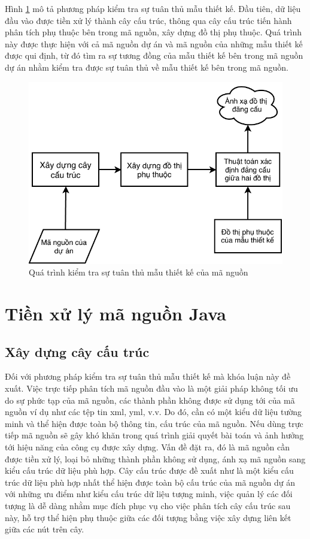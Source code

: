 \documentclass[12pt]{report}
\begin{document}
\noindent Hình \ref{fig:general_architecture} mô tả phương pháp kiểm tra sự tuân thủ mẫu thiết kế. Đầu tiên, dữ liệu đầu vào được tiền xử lý thành cây cấu trúc, thông qua cây cấu trúc tiến hành phân tích phụ thuộc bên trong mã nguồn, xây dựng đồ thị phụ thuộc. Quá trình này được thực hiện với cả mã nguồn dự án và mã nguồn của những mẫu thiết kế được qui định, từ đó tìm ra sự tương đồng của mẫu thiết kế bên trong mã nguồn dự án nhằm kiểm tra được sự tuân thủ về mẫu thiết kế bên trong mã nguồn.
\begin{figure}[h]
	\centering
	\includegraphics[scale=1.1]{images/general_architecture_3_1_2}
	\caption{Quá trình kiểm tra sự tuân thủ mẫu thiết kế của mã nguồn}
	\label{fig:general_architecture}
\end{figure}
\section{Tiền xử lý mã nguồn Java}
\subsection{Xây dựng cây cấu trúc}
Đối với phương pháp kiểm tra sự tuân thủ mẫu thiết kế mà khóa luận này đề xuất. Việc trực tiếp phân tích mã nguồn đầu vào là một giải pháp không tối ưu do sự phức tạp của mã nguồn, các thành phần không được sử dụng tới của mã nguồn ví dụ như các tệp tin xml, yml, v.v. Do đó, cần có một kiểu dữ liệu tường minh và thể hiện được toàn bộ thông tin, cấu trúc của mã nguồn. Nếu dùng trực tiếp mã nguồn sẽ gây khó khăn trong quá trình giải quyết bài toán và ảnh hưởng tới hiệu năng của công cụ được xây dựng. Vấn đề đặt ra, đó là mã nguồn cần được tiền xử lý, loại bỏ những thành phần không sử dụng, ánh xạ mã nguồn sang kiểu cấu trúc dữ liệu phù hợp. Cây cấu trúc được đề xuất như là một kiểu cấu trúc dữ liệu phù hợp nhất thể hiện được toàn bộ cấu trúc của mã nguồn dự án với những ưu điểm như kiểu cấu trúc dữ liệu tượng minh, việc quản lý các đối tượng là dễ dàng nhằm mục đích phục vụ cho việc phân tích cây cấu trúc sau này, hỗ trợ thể hiện phụ thuộc giữa các đối tượng bằng việc xây dựng liên kết giữa các nút trên cây.
\end{document}
